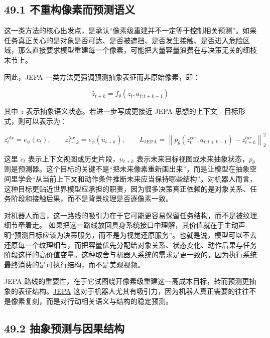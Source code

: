 \subsection*{49.1 不重构像素而预测语义}


这一类方法的核心出发点，是承认“像素级重建并不一定等于控制相关预测”。如果任务真正关心的是对象是否可达、是否被遮挡、是否发生接触、是否进入危险区域，那么直接要求模型重建每一个像素，可能把大量容量浪费在与决策无关的细枝末节上。

因此，JEPA 一类方法更强调预测抽象表征而非原始像素，即：

\begin{equation*}
\hat{z}_{t+k} = f_\theta(z_t, a_{t:t+k-1})
\end{equation*}

其中 \(z\) 表示抽象语义状态。若进一步写成更接近 JEPA 思想的上下文 - 目标形式，则可以表示为：

\begingroup
\scriptsize
\begin{equation*}
z_t^{ctx} = e_\phi(c_t), \qquad
z_{t+k}^{tar} = e_\phi(u_{t+k}), \qquad
L_{\mathrm{JEPA}} = \left\| p_\theta(z_t^{ctx}, a_{t:t+k-1}) - z_{t+k}^{tar} \right\|_2^2
\end{equation*}
\endgroup

这里 \(c_t\) 表示上下文视图或历史片段，\(u_{t+k}\) 表示未来目标视图或未来抽象状态，\(p_\theta\) 则是预测器。这个目标的关键不是“把未来像素重新画出来”，而是让模型在抽象空间里学会“从当前上下文和动作条件推断未来应当保持哪些结构”。对机器人而言，这种目标更贴近世界模型应承担的职责，因为很多决策真正依赖的是对象关系、任务阶段和接触后果，而不是背景纹理是否逐像素一致。

对机器人而言，这一路线的吸引力在于它可能更容易保留任务结构，而不是被纹理细节牵着走。 如果把这一路线放回具身系统接口中理解，其价值就在于主动声明“预测目标应该为决策服务，而不是为视觉还原服务”。也就是说，模型可以不去还原每一个纹理细节，而把容量优先分配给对象关系、状态变化、动作后果与任务阶段这样的高价值变量。这种取舍与机器人系统的需求是更一致的，因为执行系统最终消费的是可执行结构，而不是美观视频。

JEPA 路线的重要性，在于它试图绕开像素级重建这一高成本目标，转而预测更抽象的表征结构。\href{https://arxiv.org/abs/2301.08243}{JEPA} 这对于机器人尤其有吸引力，因为机器人真正需要的往往不是像素复刻，而是对行动相关语义与结构的稳定预测。

\subsection*{49.2 抽象预测与因果结构}


